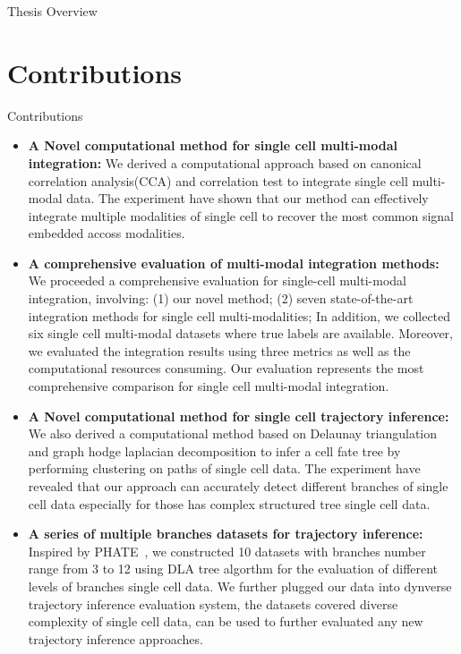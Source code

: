 Thesis Overview
\section{Contributions}
\label{introduction:sec3.contributions}

Contributions

\begin{itemize}
	\item \textbf{A Novel computational method for single cell multi-modal integration:} We derived a computational approach based on canonical correlation analysis(CCA) and correlation test to integrate single cell multi-modal data. The experiment have shown that our method can effectively integrate multiple modalities of single cell to recover the most common signal embedded accoss modalities.

	\item \textbf{A comprehensive evaluation of multi-modal integration methods:} We proceeded a comprehensive evaluation for single-cell multi-modal integration, involving: (1) our novel method; (2) seven state-of-the-art integration methods for single cell multi-modalities; In addition, we collected six single cell multi-modal datasets where true labels are available. Moreover, we evaluated the integration results using three metrics as well as the computational resources consuming. Our evaluation represents the most comprehensive comparison for single cell multi-modal integration.

	\item \textbf{A Novel computational method for single cell trajectory inference:} We also derived a computational method based on Delaunay triangulation and graph hodge laplacian decomposition to infer a cell fate tree by performing clustering on paths of single cell data. The experiment have revealed that our approach can accurately detect different branches of single cell data especially for those has complex structured tree single cell data.

	\item \textbf{A series of multiple branches datasets for trajectory inference:} Inspired by PHATE~\citep{moon2017phate}, we constructed 10 datasets with branches number range from 3 to 12 using DLA tree algorthm for the evaluation of different levels of branches single cell data. We further plugged our data into dynverse trajectory inference evaluation system, the datasets covered diverse complexity of single cell data, can be used to further evaluated any new trajectory inference approaches.


\end{itemize}
